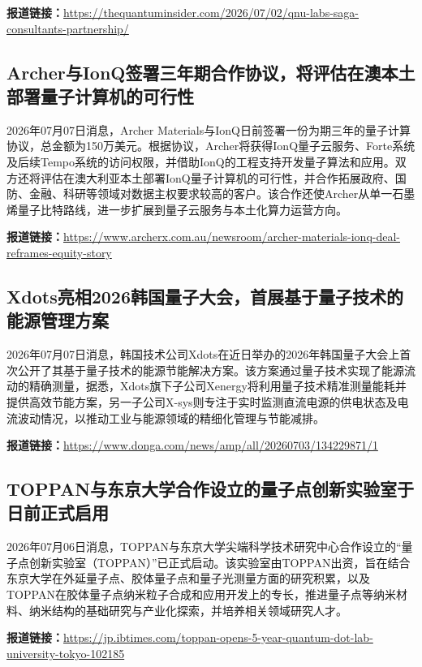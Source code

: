 \documentclass[12pt,a4paper]{ctexart}
\begin{document}
\noindent\textbf{报道链接：}\url{https://thequantuminsider.com/2026/07/02/qnu-labs-saga-consultants-partnership/}

\subsection{ Archer与IonQ签署三年期合作协议，将评估在澳本土部署量子计算机的可行性 }

2026年07月07日消息，Archer Materials与IonQ日前签署一份为期三年的量子计算协议，总金额为150万美元。根据协议，Archer将获得IonQ量子云服务、Forte系统及后续Tempo系统的访问权限，并借助IonQ的工程支持开发量子算法和应用。双方还将评估在澳大利亚本土部署IonQ量子计算机的可行性，并合作拓展政府、国防、金融、科研等领域对数据主权要求较高的客户。该合作还使Archer从单一石墨烯量子比特路线，进一步扩展到量子云服务与本土化算力运营方向。

\noindent\textbf{报道链接：}\url{https://www.archerx.com.au/newsroom/archer-materials-ionq-deal-reframes-equity-story}

\subsection{ Xdots亮相2026韩国量子大会，首展基于量子技术的能源管理方案 }

2026年07月07日消息，韩国技术公司Xdots在近日举办的2026年韩国量子大会上首次公开了其基于量子技术的能源节能解决方案。该方案通过量子技术实现了能源流动的精确测量，据悉，Xdots旗下子公司Xenergy将利用量子技术精准测量能耗并提供高效节能方案，另一子公司X-sys则专注于实时监测直流电源的供电状态及电流波动情况，以推动工业与能源领域的精细化管理与节能减排。

\noindent\textbf{报道链接：}\url{https://www.donga.com/news/amp/all/20260703/134229871/1}

\subsection{ TOPPAN与东京大学合作设立的量子点创新实验室于日前正式启用 }

2026年07月06日消息，TOPPAN与东京大学尖端科学技术研究中心合作设立的“量子点创新实验室（TOPPAN）”已正式启动。该实验室由TOPPAN出资，旨在结合东京大学在外延量子点、胶体量子点和量子光测量方面的研究积累，以及TOPPAN在胶体量子点纳米粒子合成和应用开发上的专长，推进量子点等纳米材料、纳米结构的基础研究与产业化探索，并培养相关领域研究人才。

\noindent\textbf{报道链接：}\url{https://jp.ibtimes.com/toppan-opens-5-year-quantum-dot-lab-university-tokyo-102185}
\end{document}
